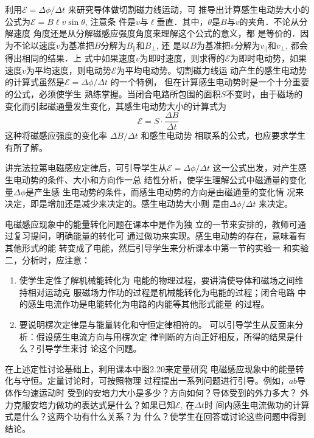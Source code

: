 利用$\mathcal{E}=\Delta\phi/\Delta t$
来研究导体做切割磁力线运动，可
推导出计算感生电动势大小的公式为$\mathcal{E}=B\ell v\sin\theta$, 注意条
件是$v$与$\ell$垂直．其中，$\theta$是$B$与$v$的夹角．不论从分解速度
角度还是从分解磁感应强度角度来理解这个公式的意义，都
是等价的．因为不论以速度$v$为基准把$B$分解为$B_{\parallel}$和$B_{\bot}$, 还
是以$B$为基准把$v$分解为$v_{\parallel}$和$v_{\bot}$, 都会得出相同的结果．上
式中如果速度$v$为即时速度，则求得的$\mathcal{E}$为即时电动势，如果
速度$v$为平均速度，则电动势$\mathcal{E}$为平均电动势。切割磁力线运
动产生的感生电动势的计算式虽然是$\mathcal{E}=\Delta\phi/\Delta t$
的一个特例，
但在计算感生电动势时是一个十分重要的公式，必须使学生
熟练掌握。当闭合电路所包围的面积$S$不变时，由于磁场的
变化而引起磁通量发生变化，其感生电动势大小的计算式为
\[\mathcal{E}=S\cdot \frac{\Delta B}{\Delta t}\]
这种将磁感应强度的变化率
$\Delta B/\Delta t$
和感生电动势
相联系的公式，也应要求学生有所了解。

讲完法拉第电磁感应定律后，可引导学生从$\mathcal{E}=\Delta\phi/\Delta t$
这一公式出发，对产生感生电动势的条件、大小和方向作一总
结性分析，使学生理解公式中磁通量的变化量$\Delta\phi$是产生感
生电动势的条件，而感生电动势的方向是由磁通量的变化情
况来决定，即是增加还是减少来决定的。感生电动势大小则
是由$\Delta\phi/\Delta t$
来决定。

电磁感应现象中的能量转化问题在课本中是作为独
立的一节来安排的，教师可通过复习提问，明确能量的转化可
通过做功来实现。感生电动势的存在，意味着有其他形式的能
转变成了电能，然后引导学生来分析课本中第一节的实验一
和实验二，分析时，应注意：
\begin{enumerate}
\item 使学生定性了解机械能转化为
电能的物理过程，要讲清使导体和磁场之间维持相对运动克
服磁场力作功的过程是机械能转化为电能的过程；闭合电路
中的感生电流作功是电能转化为电路的内能等其他形式能量
的过程。
\item 要说明楞次定律是与能量转化和守恒定律相符的。
可以引导学生从反面来分析：假设感生电流方向与用楞次定
律判断的方向正好相反，所得的结果是什么？引导学生来讨
论这个问题。
\end{enumerate}


在上述定性讨论基础上，利用课本中图2.20来定量研究
电磁感应现象中的能量转化与守恒。定量讨论时，可按照物理
过程提出一系列问题进行引导。例如，$ab$导体作匀速运动时
受到的安培力大小是多少？方向如何？导体受到的外力多大？
外力克服安培力做功的表达式是什么？如果已知$\mathcal{E}$, 在$\Delta t$时
间内感生电流做功的计算式是什么？这两个功有什么关系？为
什么？使学生在回答或讨论这些问题中得到结论。


